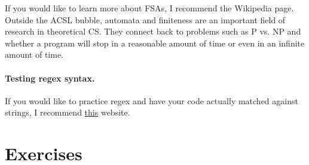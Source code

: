 \documentclass{pset_template}
\begin{document}
{\centering
{}

}

If you would like to learn more about FSAs, I recommend the Wikipedia page.
Outside the ACSL bubble, automata and finiteness
are an important field of research in theoretical CS\@.
They connect back to problems such as P vs. NP and whether a program
will stop in a reasonable amount of time or even in an infinite amount of time.

\paragraph{Testing regex syntax.}
If you would like to practice regex and have your code actually
matched against strings, I recommend \href{https://regexr.com/}{this} website.

\section{Exercises}
\end{document}
